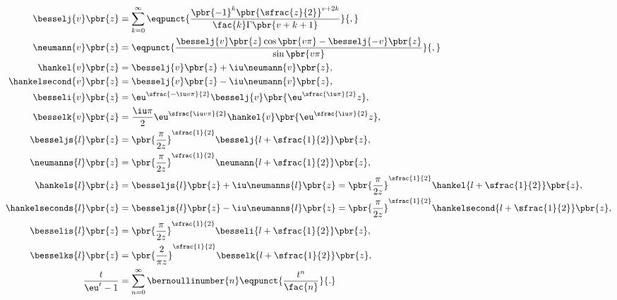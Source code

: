 \begin{align*}
  \besselj{v}\pbr{z}                 &= \sum_{k = 0}^\infty \eqpunct{\frac{\pbr{-1}^k \pbr{\sfrac{z}{2}}^{v + 2k}}{\fac{k}\Gamma\pbr{v + k + 1}}}{,}                                        \\
  \neumann{v}\pbr{z}                 &= \eqpunct{\frac{\besselj{v}\pbr{z}\cos\pbr{v\pi} - \besselj{-v}\pbr{z}}{\sin\pbr{v\pi}}}{,}                                                          \\
  \hankel{v}\pbr{z}                  &= \besselj{v}\pbr{z} + \iu\neumann{v}\pbr{z},                                                                                                         \\
  \hankelsecond{v}\pbr{z}            &= \besselj{v}\pbr{z} - \iu\neumann{v}\pbr{z},                                                                                                         \\
  \besseli{v}\pbr{z}                 &= \eu^{\sfrac{-\iu v\pi}{2}} \besselj{v}\pbr{\eu^{\sfrac{\iu\pi}{2}} z},                                                                              \\
  \besselk{v}\pbr{z}                 &= \frac{\iu\pi}{2} \eu^{\sfrac{\iu v\pi}{2}} \hankel{v}\pbr{\eu^{\sfrac{\iu\pi}{2}} z},                                                               \\
  \besseljs{l}\pbr{z}                &= \pbr{\frac{\pi}{2z}}^{\sfrac{1}{2}} \besselj{l + \sfrac{1}{2}}\pbr{z},                                                                              \\
  \neumanns{l}\pbr{z}                &= \pbr{\frac{\pi}{2z}}^{\sfrac{1}{2}} \neumann{l + \sfrac{1}{2}}\pbr{z},                                                                              \\
  \hankels{l}\pbr{z}                 &= \besseljs{l}\pbr{z} + \iu\neumanns{l}\pbr{z} = \pbr{\frac{\pi}{2z}}^{\sfrac{1}{2}} \hankel{l + \sfrac{1}{2}}\pbr{z},                                \\
  \hankelseconds{l}\pbr{z}           &= \besseljs{l}\pbr{z} - \iu\neumanns{l}\pbr{z} = \pbr{\frac{\pi}{2z}}^{\sfrac{1}{2}} \hankelsecond{l + \sfrac{1}{2}}\pbr{z},                          \\
  \besselis{l}\pbr{z}                &= \pbr{\frac{\pi}{2z}}^{\sfrac{1}{2}} \besseli{l + \sfrac{1}{2}}\pbr{z},                                                                              \\
  \besselks{l}\pbr{z}                &= \pbr{\frac{2}{\pi z}}^{\sfrac{1}{2}} \besselk{l + \sfrac{1}{2}}\pbr{z},                                                                             \\
  \frac{t}{\eu^t - 1}                &= \sum_{n = 0}^\infty \bernoullinumber{n} \eqpunct{\frac{t^n}{\fac{n}}}{.}
\end{align*}

